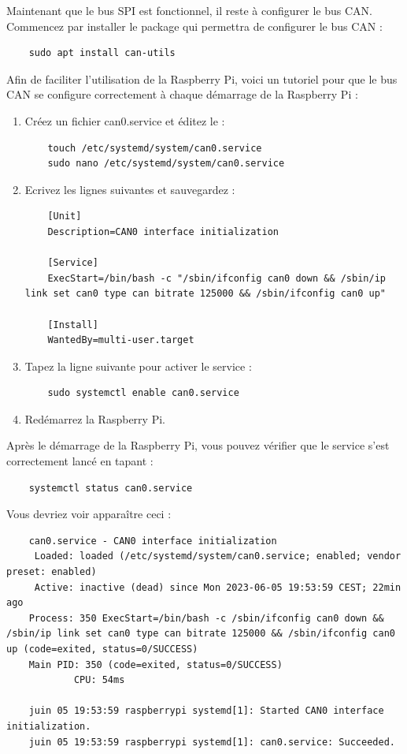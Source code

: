 Maintenant que le bus SPI est fonctionnel, il reste à configurer le bus CAN.
Commencez par installer le package qui permettra de configurer le bus CAN :
\vspace{-1.8\baselineskip} 
\begin{lstlisting}
    sudo apt install can-utils
\end{lstlisting}
Afin de faciliter l'utilisation de la Raspberry Pi, voici un tutoriel pour que le bus CAN se configure correctement à chaque démarrage de la Raspberry Pi :
\begin{enumerate}
    \item Créez un fichier can0.service et éditez le : 
\vspace{-1.8\baselineskip} 
\begin{lstlisting}
    touch /etc/systemd/system/can0.service
    sudo nano /etc/systemd/system/can0.service
\end{lstlisting}
    \item Ecrivez les lignes suivantes et sauvegardez : 
\vspace{-1.8\baselineskip} 
\begin{lstlisting}
    [Unit]
    Description=CAN0 interface initialization

    [Service]
    ExecStart=/bin/bash -c "/sbin/ifconfig can0 down && /sbin/ip link set can0 type can bitrate 125000 && /sbin/ifconfig can0 up"

    [Install]
    WantedBy=multi-user.target
\end{lstlisting}
    \item Tapez la ligne suivante pour activer le service :
\vspace{-1.8\baselineskip} 
\begin{lstlisting}
    sudo systemctl enable can0.service
\end{lstlisting}
    \item Redémarrez la Raspberry Pi. \newline
\end{enumerate}

Après le démarrage de la Raspberry Pi, vous pouvez vérifier que le service s'est correctement lancé en tapant :
\vspace{-1.8\baselineskip} 
\begin{lstlisting}
    systemctl status can0.service
\end{lstlisting}
Vous devriez voir apparaître ceci :
\vspace{-1.8\baselineskip} 
\begin{lstlisting}
    can0.service - CAN0 interface initialization
     Loaded: loaded (/etc/systemd/system/can0.service; enabled; vendor preset: enabled)
     Active: inactive (dead) since Mon 2023-06-05 19:53:59 CEST; 22min ago
    Process: 350 ExecStart=/bin/bash -c /sbin/ifconfig can0 down && /sbin/ip link set can0 type can bitrate 125000 && /sbin/ifconfig can0 up (code=exited, status=0/SUCCESS)
    Main PID: 350 (code=exited, status=0/SUCCESS)
            CPU: 54ms

    juin 05 19:53:59 raspberrypi systemd[1]: Started CAN0 interface initialization.
    juin 05 19:53:59 raspberrypi systemd[1]: can0.service: Succeeded.
\end{lstlisting}

